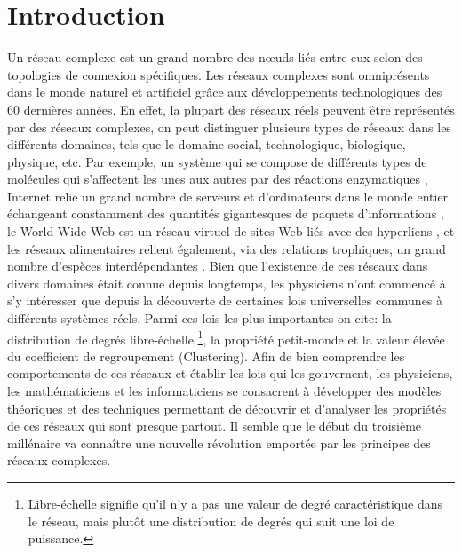 %
%
\chapter*{Introduction}
Un réseau complexe est un grand nombre des nœuds liés entre eux selon des topologies de connexion spécifiques. Les réseaux complexes sont omniprésents dans le monde naturel et artificiel grâce aux développements technologiques des $60$ dernières années. En effet,  la plupart des réseaux réels peuvent être représentés par des réseaux complexes, on peut distinguer plusieurs types de réseaux dans les différents domaines, tels que le domaine social, technologique, biologique, physique, etc. Par exemple, un système qui se compose de différents types de molécules qui s'affectent les unes aux autres par des réactions enzymatiques \cite{Je-al2000}, Internet  relie un grand nombre de serveurs et d'ordinateurs dans le monde entier échangeant constamment des quantités gigantesques de paquets d'informations \cite{F-al1999}, le World Wide Web est un réseau virtuel de sites Web liés avec des hyperliens \cite{BA1999}, et les réseaux alimentaires relient également, via des relations trophiques, un grand nombre d'espèces interdépendantes \cite{Co-al1990,Pim-al2002}. Bien que l'existence de ces réseaux dans divers domaines était connue depuis longtemps, les physiciens n'ont commencé à s'y intéresser que depuis la découverte de certaines lois universelles communes à différents systèmes réels. Parmi ces lois les plus importantes on cite: 
\textsf{la distribution de degrés} libre-échelle \footnote{ Libre-échelle signifie qu'il n'y a pas une valeur de degré caractéristique dans le réseau, mais plutôt une distribution de degrés qui suit une loi de puissance.},
la propriété \textsf{petit-monde}  
et la valeur élevée du \textsf{coefficient de regroupement} (Clustering). Afin de bien comprendre les comportements de ces réseaux et établir les lois qui les gouvernent, les physiciens, les mathématiciens et les informaticiens se consacrent à développer des modèles théoriques et des techniques permettant de découvrir  et d'analyser les propriétés de ces réseaux qui sont presque partout. Il semble que le début du troisième millénaire va connaître une nouvelle révolution emportée par les principes des réseaux complexes.\\

